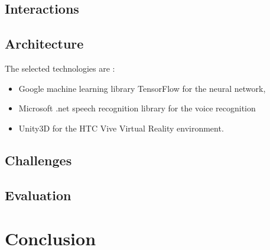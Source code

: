 \documentclass[11pt,a4paper]{article}
\begin{document}
\subsection{Interactions}


\subsection{Architecture} \label{techntechno}


The selected technologies are :
\begin{itemize}
	\item Google machine learning library TensorFlow for the neural network,
	\item Microsoft .net speech recognition library for the voice recognition
	\item Unity3D for the HTC Vive Virtual Reality environment.
\end{itemize}





\subsection{Challenges}






\subsection{Evaluation}






\section{Conclusion}
\end{document}

